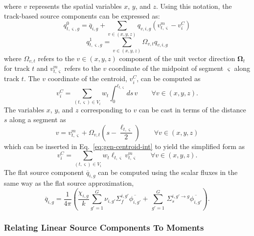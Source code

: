 where $v$ represents the spatial variables $x$, $y$, and $z$. Using this notation, the track-based source components can be expressed as:
\begin{equation}
q^0_{t,\varsigma,g} = \overline{q}_{i,g} + \sum_{v \in (x,y,z)} q_{v,i,g} \left( v^m_{t,\varsigma} - v^C_i \right)
\label{eq:q0-def}
\end{equation}
\begin{equation}
q^1_{t,\varsigma,g} = \sum_{v \in (x,y,z)} \Omega_{v,t} q_{v,i,g}
\label{eq:q1-def}
\end{equation}
where $\Omega_{v,t}$ refers to the $v\in(x,y,z)$ component of the unit vector direction $\mathbf{\Omega}_t$ for track $t$ and $v^m_{t,\varsigma}$ refers to the $v$ coordinate of the midpoint of segment $\varsigma$ along track $t$. The $v$ coordinate of the centroid, $v^C_i$, can be computed as
\begin{equation}
v^C_i = \sum_{(t,\varsigma) \in V_i} w_t \int_{0}^{\ell_{t,\varsigma}} ds \, v \qquad \forall v \in (x,y,z).
\label{eq:gen-centroid-int}
\end{equation}
The variables $x$, $y$, and $z$ corresponding to $v$ can be cast in terms of the distance $s$ along a segment as
\begin{equation}
v = v^m_{t,\varsigma} + \Omega_{v,t} \left(s - \frac{\ell_{t,\varsigma}}{2} \right) \qquad \forall v \in (x,y,z)
\label{eq:v-to-s}
\end{equation}
which can be inserted in Eq.~\ref{eq:gen-centroid-int} to yield the simplified form as
\begin{equation}
v^C_i = \sum_{(t,\varsigma) \in V_i} w_t \ell_{t,\varsigma} v^m_{t,\varsigma} \qquad \forall v \in (x,y,z).
\label{eq:gen-centroid-sum}
\end{equation}
The flat source component $\overline{q}_{i,g}$ can be computed using the scalar fluxes in the same way as the flat source approximation,
\begin{equation}
\overline{q}_{i,g} = \frac{1}{4 \pi} \left( \frac{\chi_{i,g}}{k} \sum_{g'=1}^{G} \nu_{i,g'} \Sigma_f^{i,g'} \overline{\phi_{i,g'}} + \, \sum_{g'=1}^G \,  \Sigma_{s}^{i,g' \rightarrow g} \overline{\phi_{i,g'}} \right).
\label{eq:ls-flat-source}
\end{equation}

\subsubsection{Relating Linear Source Components To Moments}
\label{sec:ls-components}

